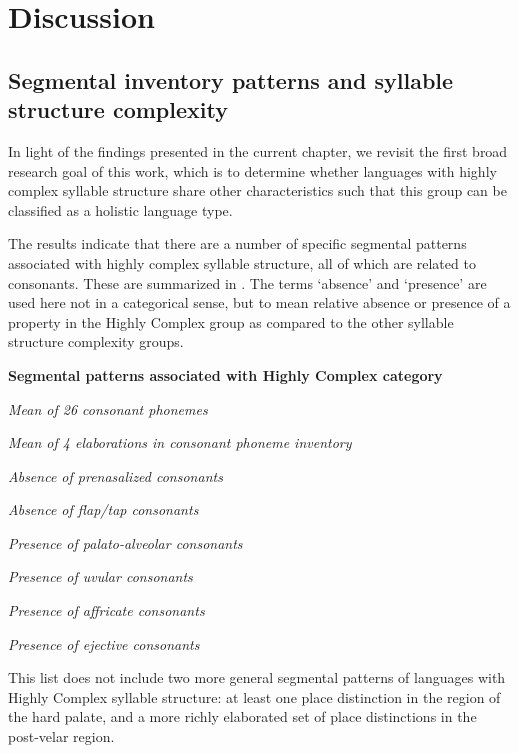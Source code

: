 \section{Discussion}\label{sec:4.5}
\subsection{Segmental inventory patterns and syllable structure complexity}\label{sec:4.5.1}

  In light of the findings presented in the current chapter, we revisit the first broad research goal of this work, which is to determine whether languages with highly complex syllable structure share other characteristics such that this group can be classified as a holistic language type.

  The results indicate that there are a number of specific segmental patterns associated with highly complex syllable structure, all of which are related to consonants. These are summarized in . The terms ‘absence’ and ‘presence’ are used here not in a categorical sense, but to mean relative absence or presence of a property in the Highly Complex group as compared to the other syllable structure complexity groups.

\ea\label{ex:4.34}
  \textbf{Segmental patterns associated with Highly Complex category}

\textit{Mean of 26 consonant phonemes}

\textit{Mean of 4 elaborations in consonant phoneme inventory}

\textit{Absence of prenasalized consonants}

\textit{Absence of flap/tap consonants}

\textit{Presence of palato-alveolar consonants}

\textit{Presence of uvular consonants}

\textit{Presence of affricate consonants} 

\textit{Presence of ejective consonants}
\z

  This list does not include two more general segmental patterns of languages with Highly Complex syllable structure: at least one place distinction in the region of the hard palate, and a more richly elaborated set of place distinctions in the post-velar region.

